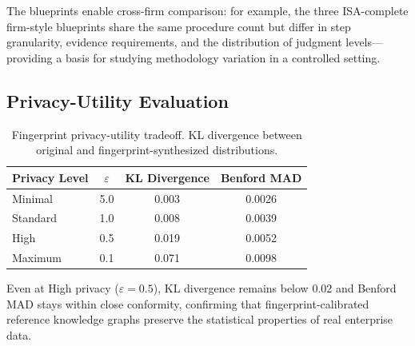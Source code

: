 The blueprints enable cross-firm comparison: for example, the three
ISA-complete firm-style blueprints share the same procedure count but
differ in step granularity, evidence requirements, and the distribution
of judgment levels---providing a basis for studying methodology
variation in a controlled setting.

\subsection{Privacy-Utility Evaluation}
\label{sec:exp_privacy}

\begin{table}[t]
\centering
\caption{Fingerprint privacy-utility tradeoff.  KL divergence between
  original and fingerprint-synthesized distributions.}
\label{tab:privacy_utility}
\small
\begin{tabular}{lccc}
\toprule
\textbf{Privacy Level} & $\varepsilon$ & \textbf{KL Divergence}
  & \textbf{Benford MAD} \\
\midrule
Minimal  & 5.0 & 0.003 & 0.0026 \\
Standard & 1.0 & 0.008 & 0.0039 \\
High     & 0.5 & 0.019 & 0.0052 \\
Maximum  & 0.1 & 0.071 & 0.0098 \\
\bottomrule
\end{tabular}
\end{table}

Even at High privacy ($\varepsilon = 0.5$), KL divergence remains
below 0.02 and Benford MAD stays within close conformity, confirming
that fingerprint-calibrated reference knowledge graphs preserve the
statistical properties of real enterprise data.

